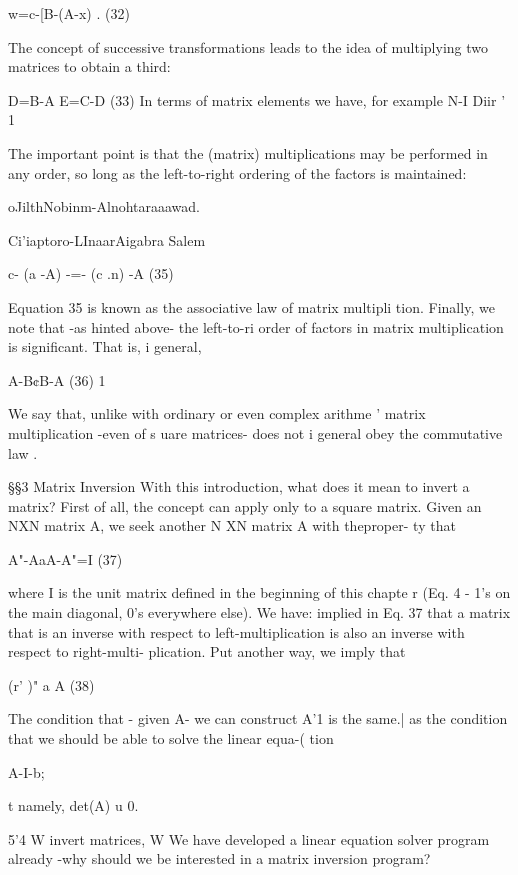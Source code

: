 {w=c-[B-(A-x) . (32)

 

The concept of successive transformations leads to the idea of
multiplying two matrices to obtain a third:

D=B-A E=C-D (33)
In terms of matrix elements we have, for example
N-I
Diir ' 1%

The important point is that the (matrix) multiplications may be
performed in any order, so long as the left-to-right ordering of
the factors is maintained:

oJilthNobinm-Alnohtaraaawad.

Ci'iaptoro-LInaarAigabra Salem

   
  
  
  
  

c- (a -A) -=- (c .n) -A (35)

Equation 35 is known as the associative law of matrix multipli
tion. Finally, we note that -as hinted above- the left-to-ri
order of factors in matrix multiplication is significant. That is, i
general,

A-B¢B-A (36) 1

We say that, unlike with ordinary or even complex arithme '
matrix multiplication -even of s uare matrices- does not i
general obey the commutative law .

\S\S3 Matrix Inversion
With this introduction, what does it mean to invert a matrix? First
of all, the concept can apply only to a square matrix. Given an
NXN matrix A, we seek another N XN matrix A with theproper-
ty that

 

A"-AaA-A"=I (37)

where I is the unit matrix defined in the beginning of this chapte r
(Eq. 4 - 1's on the main diagonal, 0's everywhere else). We have:
implied in Eq. 37 that a matrix that is an inverse with respect to
left-multiplication is also an inverse with respect to right-multi-
plication. Put another way, we imply that

(r' )" a A (38)

The condition that - given A- we can construct A'1 is the same.|
as the condition that we should be able to solve the linear equa-(
tion

A-I-b;

t namely, det(A) u 0.

5'4 W invert matrices, W
We have developed a linear equation solver program already
-why should we be interested in a matrix inversion program?

}
